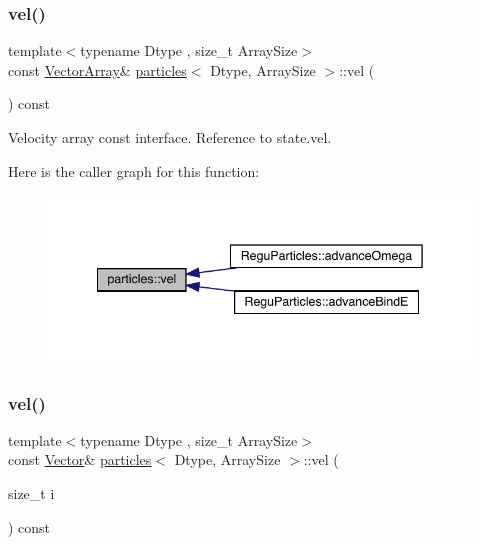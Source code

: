 \subsubsection{\texorpdfstring{vel()}{vel()}\hspace{0.1cm}{\footnotesize\ttfamily [1/2]}}
{\footnotesize\ttfamily template$<$typename Dtype , size\+\_\+t Array\+Size$>$ \\
const \mbox{\hyperlink{classparticles_ac5dddc8c666e4f7057b5109f95926363}{Vector\+Array}}\& \mbox{\hyperlink{classparticles}{particles}}$<$ Dtype, Array\+Size $>$\+::vel (\begin{DoxyParamCaption}{ }\end{DoxyParamCaption}) const\hspace{0.3cm}{\ttfamily [inline]}}



Velocity array const interface. Reference to state.\+vel. 

Here is the caller graph for this function\+:
\nopagebreak
\begin{figure}[H]
\begin{center}
\leavevmode
\includegraphics[width=342pt]{classparticles_ab6116d23f77eb1e10c0b755f3f273c8b_icgraph}
\end{center}
\end{figure}
\mbox{\label{classparticles_a20e4848e04fd15de36b6c3c442dd7840}} 
\subsubsection{\texorpdfstring{vel()}{vel()}\hspace{0.1cm}{\footnotesize\ttfamily [2/2]}}
{\footnotesize\ttfamily template$<$typename Dtype , size\+\_\+t Array\+Size$>$ \\
const \mbox{\hyperlink{classparticles_a1ef27d2f046db6514d79c8d7ee5c97d5}{Vector}}\& \mbox{\hyperlink{classparticles}{particles}}$<$ Dtype, Array\+Size $>$\+::vel (\begin{DoxyParamCaption}\item[{size\+\_\+t}]{i }\end{DoxyParamCaption}) const\hspace{0.3cm}{\ttfamily [inline]}}



